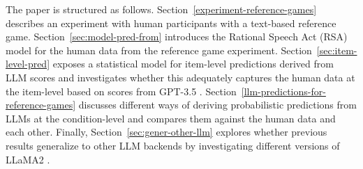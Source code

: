 \documentclass[fleqn]{article}
\begin{document}

The paper is structured as follows.
Section~\ref{experiment-reference-games} describes an experiment with human participants with a text-based reference game.
Section~\ref{sec:model-pred-from} introduces the Rational Speech Act (RSA) model for the human data from the reference game experiment.
Section~\ref{sec:item-level-pred} exposes a statistical model for item-level predictions derived from LLM scores and investigates whether this adequately captures the human data at the item-level based on scores from GPT-3.5 \citep{BrownMann2020:Language-Models}.
Section~\ref{llm-predictions-for-reference-games} discusses different ways of deriving probabilistic predictions from LLMs at the condition-level and compares them against the human data and each other.
Finally, Section~\ref{sec:gener-other-llm} explores whether previous results generalize to other LLM backends by investigating different versions of LLaMA2 \citep{TouvronLavril2023:LLaMA:-Open-and}.
\end{document}
